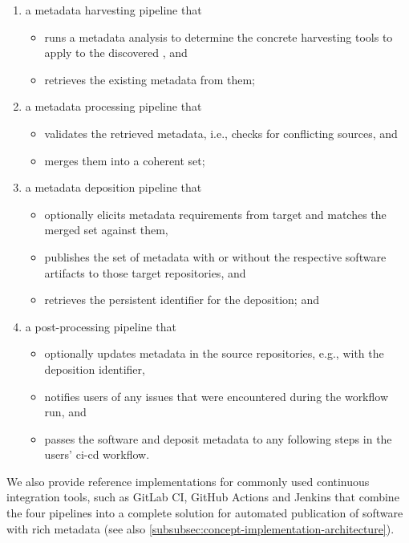 \documentclass[11pt,a4paper]{scrartcl}
\begin{document}
\begin{enumerate}  
    \item a metadata harvesting pipeline that
        \begin{itemize}  
            \item runs a metadata analysis to determine the concrete harvesting tools to apply to the discovered , and
            \item retrieves the existing metadata from them;
        \end{itemize}
    \item a metadata processing pipeline that
        \begin{itemize}  
            \item validates the retrieved metadata, i.e., checks for conflicting sources, and
            \item merges them into a coherent set;
        \end{itemize}
    \item a metadata deposition pipeline that
        \begin{itemize}  
            \item optionally elicits metadata requirements from target  and matches the merged set against them,
            \item publishes the set of metadata with or without the respective software artifacts to those target repositories, and
            \item retrieves the persistent identifier for the deposition; and
        \end{itemize}
    \item a post-processing pipeline that 
        \begin{itemize}  
            \item optionally updates metadata in the source repositories, e.g., with the deposition identifier,
            \item notifies users of any issues that were encountered during the workflow run, and
            \item passes the software and deposit metadata to any following steps in the users’ \gls{ci-cd} workflow.
        \end{itemize}
\end{enumerate}

We also provide reference implementations for commonly used continuous integration tools, such as GitLab CI, GitHub Actions
and Jenkins that combine the four pipelines into a complete solution for automated publication of software with rich metadata
(see also \ref{subsubsec:concept-implementation-architecture}).
\end{document}
